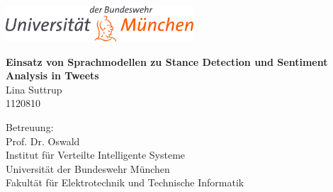 \thispagestyle{empty}
\vspace*{-2ex}

\centerline{\includegraphics[width=7cm]{pics/athene.png}}
\vspace{4cm}

\begin{center}

\begin{minipage}[t]{17cm}     
\begin{center}
{\LARGE\bf Einsatz von Sprachmodellen zu Stance Detection und Sentiment Analysis in Tweets }\\[1cm]
Lina Suttrup\\
1120810\\[5mm]
\end{center}
\end{minipage}               

\vspace*{5cm}
Betreuung:\\
Prof. Dr. Oswald \\[4cm]

Institut f\"ur Verteilte Intelligente Systeme\\
Universit\"at der Bundeswehr M\"unchen\\
Fakult\"at f\"ur Elektrotechnik und Technische Informatik\\

\end{center}
